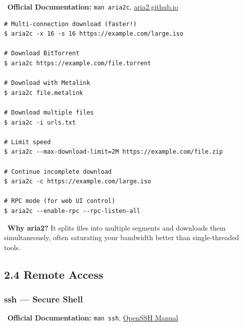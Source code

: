 \documentclass[12pt]{article}
\newcommand{\bookicon}{\faBook}
\begin{document}
\begin{infobox}
\bookicon\ \textbf{Official Documentation:} \texttt{man aria2c}, \href{https://aria2.github.io/manual/en/html/}{aria2.github.io}
\end{infobox}

\begin{highlightbox}
\begin{verbatim}
# Multi-connection download (faster!)
$ aria2c -x 16 -s 16 https://example.com/large.iso

# Download BitTorrent
$ aria2c https://example.com/file.torrent

# Download with Metalink
$ aria2c file.metalink

# Download multiple files
$ aria2c -i urls.txt

# Limit speed
$ aria2c --max-download-limit=2M https://example.com/file.zip

# Continue incomplete download
$ aria2c -c https://example.com/large.iso

# RPC mode (for web UI control)
$ aria2c --enable-rpc --rpc-listen-all
\end{verbatim}
\end{highlightbox}

\begin{infobox}
\faRocket\ \textbf{Why aria2?} It splits files into multiple segments and downloads them simultaneously, often saturating your bandwidth better than single-threaded tools.
\end{infobox}

\subsection*{2.4 Remote Access}

\subsubsection*{ssh — Secure Shell}

\begin{infobox}
\bookicon\ \textbf{Official Documentation:} \texttt{man ssh}, \href{https://www.openssh.com/manual.html}{OpenSSH Manual}
\end{infobox}
\end{document}
